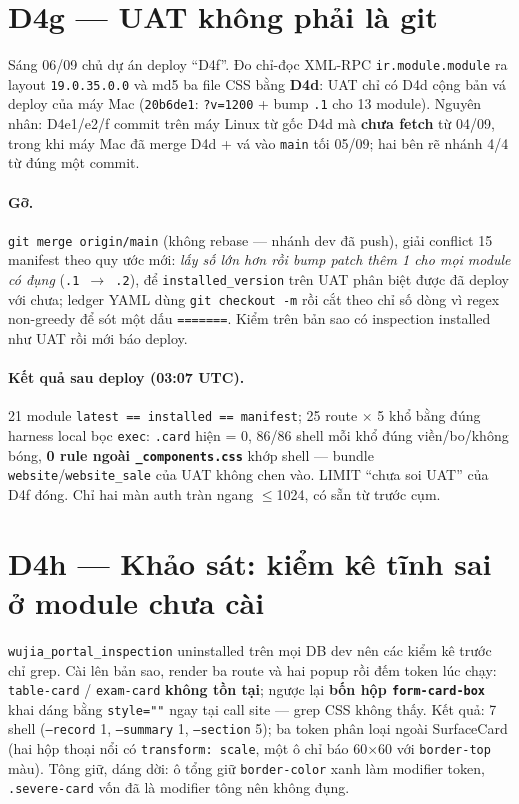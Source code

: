 \section{D4g --- UAT không phải là git}

Sáng 06/09 chủ dự án deploy ``D4f''. Đo chỉ-đọc XML-RPC \texttt{ir.module.module} ra layout
\texttt{19.0.35.0.0} và md5 ba file CSS bằng \textbf{D4d}: UAT chỉ có D4d cộng bản vá deploy
của máy Mac (\texttt{20b6de1}: \texttt{?v=1200} + bump \texttt{.1} cho 13 module). Nguyên nhân:
D4e1/e2/f commit trên máy Linux từ gốc D4d mà \textbf{chưa fetch} từ 04/09, trong khi máy Mac đã
merge D4d + vá vào \texttt{main} tối 05/09; hai bên rẽ nhánh 4/4 từ đúng một commit.

\paragraph{Gỡ.} \texttt{git merge origin/main} (không rebase --- nhánh dev đã push), giải conflict
15 manifest theo quy ước mới: \emph{lấy số lớn hơn rồi bump patch thêm 1 cho mọi module có đụng}
(\texttt{.1 $\to$ .2}), để \texttt{installed\_version} trên UAT phân biệt được đã deploy với chưa;
ledger YAML dùng \texttt{git checkout -m} rồi cắt theo chỉ số dòng vì regex non-greedy để sót
một dấu \texttt{=======}. Kiểm trên bản sao có inspection installed như UAT rồi mới báo deploy.

\paragraph{Kết quả sau deploy (03:07 UTC).} 21 module \texttt{latest == installed == manifest};
25 route $\times$ 5 khổ bằng đúng harness local bọc \texttt{exec}: \texttt{.card} hiện = 0, 86/86
shell mỗi khổ đúng viền/bo/không bóng, \textbf{0 rule ngoài \texttt{\_components.css}} khớp shell
--- bundle \texttt{website}/\texttt{website\_sale} của UAT không chen vào. LIMIT ``chưa soi UAT''
của D4f đóng. Chỉ hai màn auth tràn ngang $\le$1024, có sẵn từ trước cụm.

\section{D4h --- Khảo sát: kiểm kê tĩnh sai ở module chưa cài}

\texttt{wujia\_portal\_inspection} uninstalled trên mọi DB dev nên các kiểm kê trước chỉ grep.
Cài lên bản sao, render ba route và hai popup rồi đếm token lúc chạy: \texttt{table-card} /
\texttt{exam-card} \textbf{không tồn tại}; ngược lại \textbf{bốn hộp \texttt{form-card-box}} khai
dáng bằng \texttt{style=""} ngay tại call site --- grep CSS không thấy. Kết quả: 7 shell
(\texttt{--record} 1, \texttt{--summary} 1, \texttt{--section} 5); ba token phân loại ngoài
SurfaceCard (hai hộp thoại nổi có \texttt{transform: scale}, một ô chỉ báo 60$\times$60 với
\texttt{border-top} màu). Tông giữ, dáng dời: ô tổng giữ \texttt{border-color} xanh làm modifier
token, \texttt{.severe-card} vốn đã là modifier tông nên không đụng.

